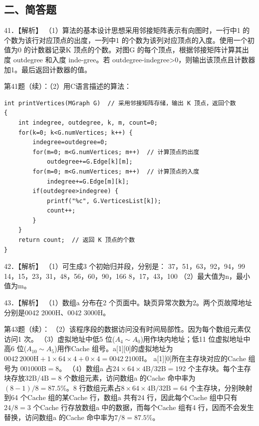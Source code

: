 \documentclass[UTF8,11pt]{ctexart}
\begin{document}
\subsection*{二、简答题}

41．【解析】 （1）算法的基本设计思想采用邻接矩阵表示有向图时，一行中1 的个数为该行对应顶点的出度，一列中1 的个数为该列对应顶点的入度。使用一个初值为0 的计数器记录K 顶点的个数。对图G 的每个顶点，根据邻接矩阵计算其出度 outdegree 和入度 inde-gree。若 outdegree-indegree>0，则输出该顶点且计数器加1。最后返回计数器的值。


第41题（续）：（2）用C语言描述的算法：


\begin{Verbatim}[breaklines,breakanywhere,fontsize=\small]
int printVertices(MGraph G)  // 采用邻接矩阵存储，输出 K 顶点，返回个数
{
    int indegree, outdegree, k, m, count=0;
    for(k=0; k<G.numVertices; k++) {
        indegree=outdegree=0;
        for(m=0; m<G.numVertices; m++)  // 计算顶点的出度
            outdegree+=G.Edge[k][m];
        for(m=0; m<G.numVertices; m++)  // 计算顶点的入度
            indegree+=G.Edge[m][k];
        if(outdegree>indegree) {
            printf("%c", G.VerticesList[k]);
            count++;
        }
    }
    return count;  // 返回 K 顶点的个数
}
\end{Verbatim}

42．【解析】 （1）可生成3 个初始归并段，分别是： 37，51，63，92，94，99 14，15，23，31，48，56，60，90，166 8，17，43，100 （2）最大值为n，最小值为m。


43．【解析】 （1）数组a 分布在2 个页面中。缺页异常次数为2。两个页故障地址分别是0042 2000H、0042 3000H。


第43题（续）： （2）该程序段的数据访问没有时间局部性。因为每个数组元素仅访问1 次。 （3）虚拟地址中低5 位(\(\displaystyle A_4\sim A_0\))用作块内地址；低11 位虚拟地址中高6 位(\(\displaystyle A_{10}\sim A_5\))用作Cache 组号。a[1][0]的虚拟地址为 \(\displaystyle \mathrm{0042\ 2000H}+1\times64\times4+0\times4=\mathrm{0042\ 2100H}\)。 a[1][0]所在主存块对应的Cache 组号为 \(\displaystyle 001000\mathrm{B}=8\)。 （4）数组a 占\(\displaystyle 24\times64\times4\mathrm{B}/32\mathrm{B}=192\) 个主存块。每个主存块存放\(\displaystyle 32\mathrm{B}/4\mathrm{B}=8\) 个数组元素，访问数组a 的Cache 命中率为\(\displaystyle (8-1)/8=87.5\%\)。8 行数组元素占\(\displaystyle 8\times64\times4\mathrm{B}/32\mathrm{B}=64\) 个主存块，分别映射到64 个Cache 组的某Cache 行，数组a 共有24 行，因此每个Cache 组中只有\(\displaystyle 24/8=3\) 个Cache 行存放数组a 中的数据，而每个Cache 组有4 行，因而不会发生替换，访问数组a 的Cache 命中率为\(\displaystyle 7/8=87.5\%\)。
\end{document}
